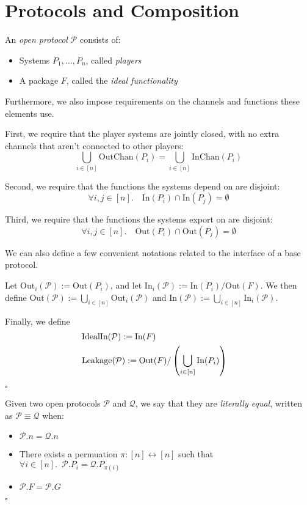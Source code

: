 \section{Protocols and Composition}

\begin{definition}
An \emph{open protocol} $\mathcal{P}$ consists of:
\begin{itemize}
\item Systems $P_1, \ldots, P_n$, called \emph{players}
\item A package $F$, called the \emph{ideal functionality}
\end{itemize}

Furthermore, we also impose requirements on the channels and functions
these elements use.

First, we require that the player systems are jointly closed,
with no extra channels that aren't connected to other players:
$$
\bigcup_{i \in [n]} \text{OutChan}(P_i) = \bigcup_{i \in [n]} \text{InChan}(P_i)
$$

Second, we require that the functions the systems depend on are disjoint:
$$
\forall i, j \in [n].\quad \text{In}(P_i) \cap \text{In}(P_j) = \emptyset
$$

Third, we require that the functions the systems export on are disjoint:
$$
\forall i, j \in [n].\quad \text{Out}(P_i) \cap \text{Out}(P_j) = \emptyset
$$

We can also define a few convenient notations related to the interface of a base
protocol.

Let $\text{Out}_i(\mathcal{P}) := \text{Out}(P_i)$, and let $\text{In}_i(\mathcal{P}) := \text{In}(P_i) / \text{Out}(F)$.
We then define $\text{Out}(\mathcal{P}) := \bigcup_{i \in [n]} \text{Out}_i(\mathcal{P})$
and $\text{In}(\mathcal{P}) := \bigcup_{i \in [n]} \text{In}_i(\mathcal{P})$.

Finally, we define
$$
\begin{aligned}
&\text{IdealIn}(\mathcal{P}) := \text{In}(F)\cr
&\text{Leakage}(\mathcal{P}) := \text{Out}(F) / \left(\bigcup_{i \in [n]} \text{In}(P_i)\right)
\end{aligned}
$$

$\square$
\end{definition}

\begin{definition}
Given two open protocols $\mathcal{P}$ and $\mathcal{Q}$, we say that
they are \emph{literally equal}, written as $\mathcal{P} \equiv \mathcal{Q}$
when:
\begin{itemize}
\item $\mathcal{P}.n = \mathcal{Q}.n$
\item There exists a permuation $\pi : [n] \leftrightarrow [n]$ such that
$
{\forall i \in [n].\enspace \mathcal{P}.P_i = \mathcal{Q}.P_{\pi(i)}}
$
\item $\mathcal{P}.F = \mathcal{P}.G$
\end{itemize}

$\square$
\end{definition}

